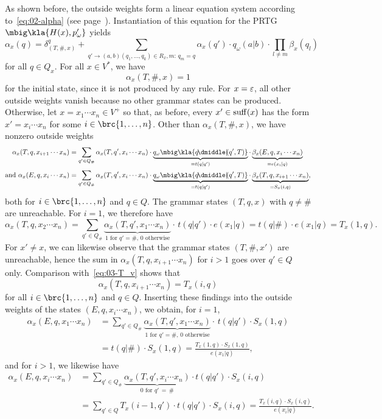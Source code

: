 As shown before, the outside weights form a linear equation system according
to~\eqref{eq:02-alpha} (see page~\pageref{eq:02-alpha}). Instantiation of this
equation for the PRTG $\mbig\kla{H(x),p_\omega'}$ yields
\[
 \alpha_x(q) = \delta_{(T,\#,x)}^q + \sum_{q'\to(a,b)(q_1,\ldots,q_k)\in R_x, m:\,q_m=q} \alpha_x(q') \cdot q_\omega(a|b) \cdot \prod_{l\neq m} \beta_x(q_l)
\]
for all $q\in Q_x$. For all $x\in V^*$, we have
\label{eq:03-alpha-eps}\[
 \alpha_x(T,\#,x) = 1
\]
for the initial state, since it is not produced by any rule. For $x=\varepsilon$, all
other outside weights vanish because no other grammar states can be produced.
Otherwise, let $x=x_1\cdots x_n\in V^+$ so that, as before, every
$x'\in\operatorname{suff}(x)$ has the form $x'=x_i\cdots x_n$ for some
$i\in\brc{1,\ldots,n}$. Other than $\alpha_x(T,\#,x)$, we have nonzero
outside weights
\begin{align*}
 \alpha_x(T,q,x_{i+1}\cdots x_n) &= \sum_{q'\in Q_\#} \alpha_x(T,q',x_i\cdots x_n) \cdot \underbrace{q_\omega\mbig\kla{q\npipe(q',T)}}_{=t(q|q')} \cdot \underbrace{\beta_x(E,q,x_i\cdots x_n)}_{=e(x_i|q)} \\
 \text{and }
 \alpha_x(E,q,x_i\cdots x_n)     &= \sum_{q'\in Q_\#} \alpha_x(T,q',x_i\cdots x_n) \cdot \underbrace{q_\omega\mbig\kla{q\npipe(q',T)}}_{=t(q|q')} \cdot \underbrace{\beta_x(T,q,x_{i+1}\cdots x_n)}_{=S_x(i,q)},
\end{align*}
both for $i\in\brc{1,\ldots,n}$ and $q\in Q$. The grammar states $(T,q,x)$ with $q\neq\#$ are unreachable. For $i=1$, we therefore have
\[
 \alpha_x(T,q,x_2\cdots x_n) = \sum_{q'\in Q_\#} \underbrace{\alpha_x(T,q',x_1\cdots x_n)}_{\text{$1$ for $q'=\#$, $0$ otherwise}} \cdot\, t(q|q') \cdot e(x_1|q)
 = t(q|\#) \cdot e(x_1|q) = T_x(1,q).
\]
For $x'\neq x$, we can likewise observe that the grammar states $(T,\#,x')$ are
unreachable, hence the sum in $\alpha_x(T,q,x_{i+1}\cdots x_n)$ for $i>1$ goes
over $q'\in Q$ only. Comparison with~\eqref{eq:03-T_v} shows that
\[
 \alpha_x(T,q,x_{i+1}\cdots x_n) = T_x(i,q)
\]
for all $i\in\brc{1,\ldots,n}$ and $q\in Q$. Inserting these findings into the
outside weights of the states $(E,q,x_i\cdots x_n)$, we obtain, for $i=1$,
\begin{align*}
 \alpha_x(E,q,x_1\cdots x_n)
 &= \sum_{q'\in Q_\#} \underbrace{\alpha_x(T,q',x_1\cdots x_n)}_{\text{$1$ for $q'=\#$, $0$ otherwise}} \cdot\, t(q|q') \cdot S_x(1,q) \\
 &= t(q|\#) \cdot S_x(1,q)
 = \frac{T_x(1,q) \cdot S_x(1,q)}{e(x_1|q)},
\end{align*}
and for $i>1$, we likewise have
\begin{align*}
 \alpha_x(E,q,x_i\cdots x_n)
 &= \sum_{q'\in Q_\#} \underbrace{\alpha_x(T,q',x_i\cdots x_n)}_{0\text{ for }q'\,=\,\#} \cdot t(q|q') \cdot S_x(i,q) \\
 &= \sum_{q'\in Q} T_x(i-1,q') \cdot t(q|q') \cdot S_x(i,q)
 = \frac{T_x(i,q) \cdot S_x(i,q)}{e(x_i|q)}.
\end{align*}

